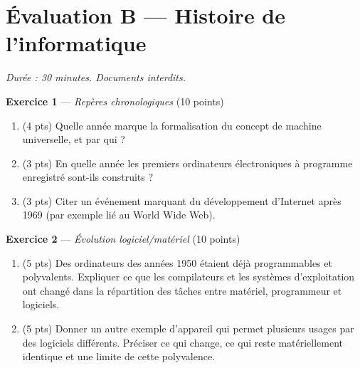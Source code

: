 \section*{Évaluation B --- Histoire de l'informatique}
\textit{Durée : 30 minutes. Documents interdits.}


\bigskip

\textbf{Exercice 1} --- \textit{Repères chronologiques} \hfill (10 points)

\begin{enumerate}
  \item (4 pts) Quelle année marque la formalisation du concept de machine universelle, et par qui ?
  \item (3 pts) En quelle année les premiers ordinateurs électroniques à programme enregistré sont-ils construits ?
  \item (3 pts) Citer un événement marquant du développement d'Internet après 1969 (par exemple lié au World Wide Web).
\end{enumerate}

\bigskip

\textbf{Exercice 2} --- \textit{Évolution logiciel/matériel} \hfill (10 points)

\begin{enumerate}
  \item (5 pts) Des ordinateurs des années 1950 étaient déjà programmables et polyvalents. Expliquer ce que les compilateurs et les systèmes d'exploitation ont changé dans la répartition des tâches entre matériel, programmeur et logiciels.
  \item (5 pts) Donner un autre exemple d'appareil qui permet plusieurs usages par des logiciels différents. Préciser ce qui change, ce qui reste matériellement identique et une limite de cette polyvalence.
\end{enumerate}
